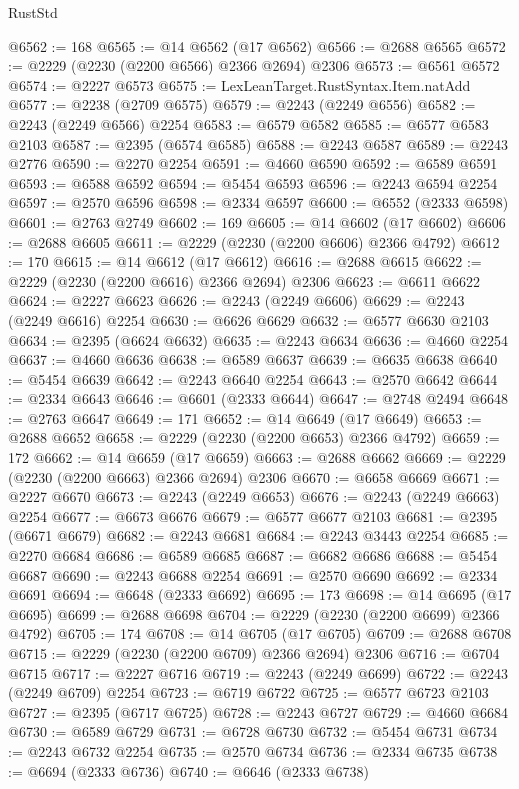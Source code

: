 \begin{lexlean}{RustStd}
\begin{coremodule}
@6562 := 168
@6565 := @14 @6562 (@17 @6562)
@6566 := @2688 @6565
@6572 := @2229 (@2230 (@2200 @6566) @2366 @2694) @2306
@6573 := @6561 @6572
@6574 := @2227 @6573
@6575 := LexLeanTarget.RustSyntax.Item.natAdd
@6577 := @2238 (@2709 @6575)
@6579 := @2243 (@2249 @6556)
@6582 := @2243 (@2249 @6566) @2254
@6583 := @6579 @6582
@6585 := @6577 @6583 @2103
@6587 := @2395 (@6574 @6585)
@6588 := @2243 @6587
@6589 := @2243 @2776
@6590 := @2270 @2254
@6591 := @4660 @6590
@6592 := @6589 @6591
@6593 := @6588 @6592
@6594 := @5454 @6593
@6596 := @2243 @6594 @2254
@6597 := @2570 @6596
@6598 := @2334 @6597
@6600 := @6552 (@2333 @6598)
@6601 := @2763 @2749
@6602 := 169
@6605 := @14 @6602 (@17 @6602)
@6606 := @2688 @6605
@6611 := @2229 (@2230 (@2200 @6606) @2366 @4792)
@6612 := 170
@6615 := @14 @6612 (@17 @6612)
@6616 := @2688 @6615
@6622 := @2229 (@2230 (@2200 @6616) @2366 @2694) @2306
@6623 := @6611 @6622
@6624 := @2227 @6623
@6626 := @2243 (@2249 @6606)
@6629 := @2243 (@2249 @6616) @2254
@6630 := @6626 @6629
@6632 := @6577 @6630 @2103
@6634 := @2395 (@6624 @6632)
@6635 := @2243 @6634
@6636 := @4660 @2254
@6637 := @4660 @6636
@6638 := @6589 @6637
@6639 := @6635 @6638
@6640 := @5454 @6639
@6642 := @2243 @6640 @2254
@6643 := @2570 @6642
@6644 := @2334 @6643
@6646 := @6601 (@2333 @6644)
@6647 := @2748 @2494
@6648 := @2763 @6647
@6649 := 171
@6652 := @14 @6649 (@17 @6649)
@6653 := @2688 @6652
@6658 := @2229 (@2230 (@2200 @6653) @2366 @4792)
@6659 := 172
@6662 := @14 @6659 (@17 @6659)
@6663 := @2688 @6662
@6669 := @2229 (@2230 (@2200 @6663) @2366 @2694) @2306
@6670 := @6658 @6669
@6671 := @2227 @6670
@6673 := @2243 (@2249 @6653)
@6676 := @2243 (@2249 @6663) @2254
@6677 := @6673 @6676
@6679 := @6577 @6677 @2103
@6681 := @2395 (@6671 @6679)
@6682 := @2243 @6681
@6684 := @2243 @3443 @2254
@6685 := @2270 @6684
@6686 := @6589 @6685
@6687 := @6682 @6686
@6688 := @5454 @6687
@6690 := @2243 @6688 @2254
@6691 := @2570 @6690
@6692 := @2334 @6691
@6694 := @6648 (@2333 @6692)
@6695 := 173
@6698 := @14 @6695 (@17 @6695)
@6699 := @2688 @6698
@6704 := @2229 (@2230 (@2200 @6699) @2366 @4792)
@6705 := 174
@6708 := @14 @6705 (@17 @6705)
@6709 := @2688 @6708
@6715 := @2229 (@2230 (@2200 @6709) @2366 @2694) @2306
@6716 := @6704 @6715
@6717 := @2227 @6716
@6719 := @2243 (@2249 @6699)
@6722 := @2243 (@2249 @6709) @2254
@6723 := @6719 @6722
@6725 := @6577 @6723 @2103
@6727 := @2395 (@6717 @6725)
@6728 := @2243 @6727
@6729 := @4660 @6684
@6730 := @6589 @6729
@6731 := @6728 @6730
@6732 := @5454 @6731
@6734 := @2243 @6732 @2254
@6735 := @2570 @6734
@6736 := @2334 @6735
@6738 := @6694 (@2333 @6736)
@6740 := @6646 (@2333 @6738)

\end{coremodule}
\end{lexlean}
